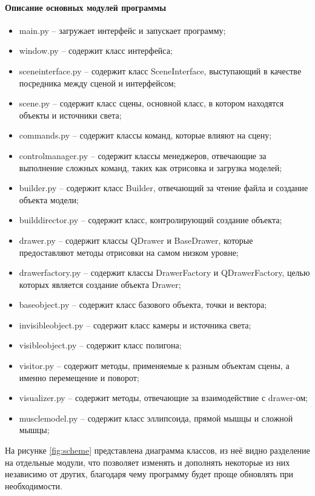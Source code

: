 \paragraph{Описание основных модулей программы}
\begin{itemize}
	\item main.py -- загружает интерфейс и запускает программу;
	\item window.py -- содержит класс интерфейса;
	\item sceneinterface.py -- содержит класс SceneInterface, выступающий в качестве посредника между сценой и интерфейсом;
	\item scene.py -- содержит класс сцены, основной класс, в котором находятся объекты и источники света;
	\item commands.py -- содержит классы команд, которые влияют на сцену;
	\item controlmanager.py -- содержит классы менеджеров, отвечающие за выполнение сложных команд, таких как отрисовка и загрузка моделей;
	\item builder.py -- содержит класс Builder, отвечающий за чтение файла и создание объекта модели;
	\item builddirector.py -- содержит класс, контролирующий создание объекта;
	\item drawer.py -- содержит классы QDrawer и BaseDrawer, которые предоставляют методы отрисовки на самом низком уровне;
	\item drawerfactory.py -- содержит классы DrawerFactory и QDrawerFactory, целью которых является создание объекта Drawer;
	\item baseobject.py -- содержит класс базового объекта, точки и вектора;
	\item invisibleobject.py -- содержит класс камеры и источника света;
	\item visibleobject.py -- содержит класс полигона;
	\item visitor.py -- содержит методы, применяемые к разным объектам сцены, а именно перемещение и поворот;
	\item visualizer.py -- содержит методы, отвечающие за взаимодействие с drawer-ом;
	\item musclemodel.py -- содержит класс эллипсоида, прямой мышцы и сложной мышцы;
\end{itemize}
\par На рисунке \ref{fig:scheme} представлена диаграмма классов, из неё видно разделение на отдельные модули, что позволяет изменять и дополнять некоторые из них независимо от других, благодаря чему программу будет проще обновлять при необходимости.
